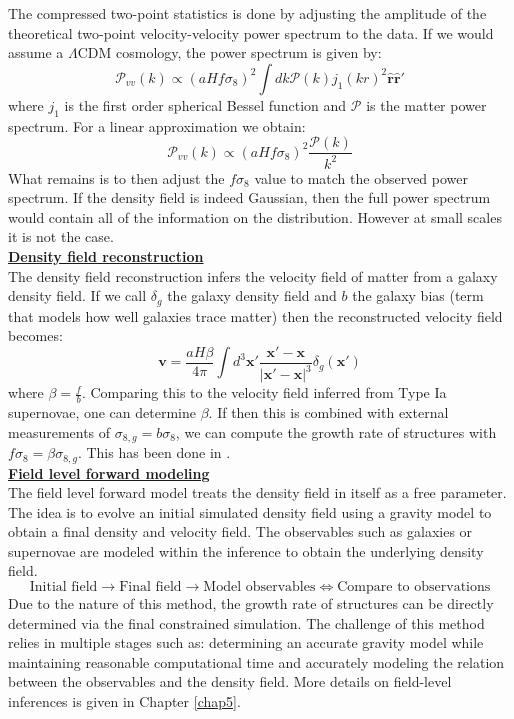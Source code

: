 The compressed two-point statistics is done by adjusting the amplitude of the theoretical two-point velocity-velocity power spectrum to the data. If we would assume a $\Lambda$CDM cosmology, 
the power spectrum is given by:
\begin{equation}
    \mathcal{P}_{vv}(k) \propto (aHf\sigma_8)^2 \int dk \mathcal{P}(k) j_1(kr)^2 \hat{\mathbf{r}}  \hat{\mathbf{r}}'
\end{equation}
where $j_1$ is the first order spherical Bessel function and $\mathcal{P}$ is the matter power spectrum. For a linear approximation we obtain:
\begin{equation}
    \mathcal{P}_{vv}(k) \propto (aHf\sigma_8)^2 \frac{\mathcal{P}(k)}{k^2}
\end{equation}
What remains is to then adjust the $f\sigma_8$ value to match the observed power spectrum. If the density field is indeed Gaussian, then the full power spectrum would 
contain all of the information on the distribution. However at small scales it is not the case. \\ 

\noindent \textbf{\underline{Density field reconstruction}} \\

The density field reconstruction infers the velocity field of matter from a galaxy density field. If we call $\delta_g$ the galaxy density field and $b$ the galaxy bias 
(term that models how well galaxies trace matter) then the reconstructed velocity field becomes:
\begin{equation}
    \mathbf{v} = \frac{aH \beta}{4\pi} \int d^3\mathbf{x'} \frac{\mathbf{x'} - \mathbf{x}}{|\mathbf{x'} - \mathbf{x}|^3} \delta_g(\mathbf{x'})
\end{equation}
where $\beta = \frac{f}{b}$. Comparing this to the velocity field inferred from Type Ia supernovae, one can determine $\beta$. If then this is combined with 
external measurements of $\sigma_{8,g} = b \sigma_8$, we can compute the growth rate of structures with $f\sigma_8 = \beta \sigma_{8,g}$. This has been done in 
\cite{Lavaux_2011}. \\

\noindent \textbf{\underline{Field level forward modeling}} \\

The field level forward model treats the density field in itself as a free parameter. The idea is to evolve an initial simulated density field using a gravity model 
to obtain a final density and velocity field. The observables such as galaxies or supernovae are modeled within the inference to obtain the underlying density field. 
$$ \text{Initial field} \longrightarrow \text{Final field} \longrightarrow \text{Model observables} \Longleftrightarrow \text{Compare to observations} $$
Due to the nature of this method, the growth rate of structures can be directly determined via the final constrained simulation. The challenge of this method relies 
in multiple stages such as: determining an accurate gravity model while maintaining reasonable computational time and accurately modeling the relation between the observables 
and the density field. More details on field-level inferences is given in Chapter \ref{chap5}. \\
